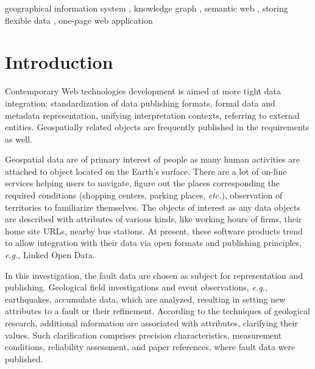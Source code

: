 \documentclass[
]{ceurart}
\begin{document}
\begin{keywords}
  geographical information system \sep
  knowledge graph \sep
  semantic web \sep
  storing flexible data \sep
  one-page web application
\end{keywords}

\maketitle

\section{Introduction}

Contemporary Web technologies development is aimed at more tight data integration: standardization of data publishing formats, formal data and metadata representation, unifying interpretation contexts, referring to external entities.  Geospatially related objects are frequently published in the requirements as well.

Geospatial data are of primary interest of people as many human activities are attached to object located on the Earth's surface.  There are a lot of on-line services helping users to navigate, figure out the places corresponding the required conditions (shopping centers, parking places, \emph{etc.}), observation of territories to familiarize themselves.  The objects of interest as any data objects are described with attributes of various kinds, like working hours of firms, their home site URLs, nearby bus stations.  At present, these software products trend to allow integration with their data via open formats and publishing principles, \emph{e.g.}, Linked Open Data.

In this investigation, the fault data are chosen as subject for representation and publishing.  Geological field investigations and event observations, \emph{e.g.}, earthquakes, accumulate data, which are analyzed, resulting in setting new attributes to a fault or their refinement.  According to the techniques of geological research, additional information are associated with attributes, clarifying their values.  Such clarification comprises precision characteristics, measurement conditions, reliability assessment, and paper references, where fault data were published.
\end{document}

